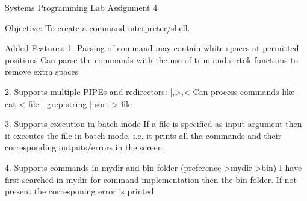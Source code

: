 						Systems Programming Lab
           						Assignment 4

Objective:
	To create a command interpreter/shell.

Added Features:
	1. Parsing of command may contain white spaces at permitted 
        positions
			Can parse the commands with the use of trim and strtok 
			functions to remove extra spaces

	2. Supports multiple PIPEs and redirectors:   |,>,< 
			Can process commands like 
			cat < file | grep string | sort > file

	3. Supports execution in batch mode
		    If a file is specified as input argument then it executes the
		    file in batch mode, i.e. it prints all tha commands and their 
             corresponding outputs/errors in the screen

	4. Supports commands in mydir and bin folder 
        (preference->mydir->bin)
		    I have first searched in mydir for command implementation
             then the bin folder. If not present the corresponing error is 
		    printed.